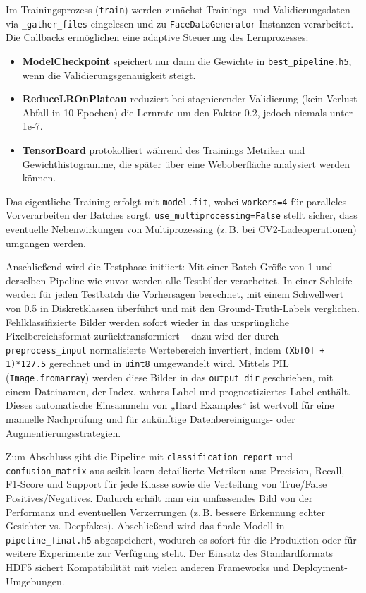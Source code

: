 Im Trainingsprozess (\texttt{train}) werden zunächst Trainings- und Validierungsdaten via \texttt{\_gather\_files} eingelesen und zu \texttt{FaceDataGenerator}-Instanzen verarbeitet. Die Callbacks ermöglichen eine adaptive Steuerung des Lernprozesses:
\begin{itemize}
  \item \textbf{ModelCheckpoint} speichert nur dann die Gewichte in \texttt{best\_pipeline.h5}, wenn die Validierungsgenauigkeit steigt.
  \item \textbf{ReduceLROnPlateau} reduziert bei stagnierender Validierung (kein Verlust-Abfall in 10 Epochen) die Lernrate um den Faktor 0.2, jedoch niemals unter 1e-7.
  \item \textbf{TensorBoard} protokolliert während des Trainings Metriken und Gewichthistogramme, die später über eine Weboberfläche analysiert werden können.
\end{itemize}
Das eigentliche Training erfolgt mit \texttt{model.fit}, wobei \texttt{workers=4} für paralleles Vorverarbeiten der Batches sorgt. \texttt{use\_multiprocessing=False} stellt sicher, dass eventuelle Nebenwirkungen von Multiprozessing (z.\,B. bei CV2-Ladeoperationen) umgangen werden.

Anschließend wird die Testphase initiiert: Mit einer Batch-Größe von 1 und derselben Pipeline wie zuvor werden alle Testbilder verarbeitet. In einer Schleife werden für jeden Testbatch die Vorhersagen berechnet, mit einem Schwellwert von 0.5 in Diskretklassen überführt und mit den Ground-Truth-Labels verglichen. Fehlklassifizierte Bilder werden sofort wieder in das ursprüngliche Pixelbereichsformat zurücktransformiert – dazu wird der durch \texttt{preprocess\_input} normalisierte Wertebereich invertiert, indem \texttt{(Xb[0] + 1)*127.5} gerechnet und in \texttt{uint8} umgewandelt wird. Mittels PIL (\texttt{Image.fromarray}) werden diese Bilder in das \texttt{output\_dir} geschrieben, mit einem Dateinamen, der Index, wahres Label und prognostiziertes Label enthält. Dieses automatische Einsammeln von „Hard Examples“ ist wertvoll für eine manuelle Nachprüfung und für zukünftige Datenbereinigungs- oder Augmentierungsstrategien.

Zum Abschluss gibt die Pipeline mit \texttt{classification\_report} und \texttt{confusion\_matrix} aus scikit-learn detaillierte Metriken aus: Precision, Recall, F1-Score und Support für jede Klasse sowie die Verteilung von True/False Positives/Negatives. Dadurch erhält man ein umfassendes Bild von der Performanz und eventuellen Verzerrungen (z.\,B. bessere Erkennung echter Gesichter vs. Deepfakes). Abschließend wird das finale Modell in \texttt{pipeline\_final.h5} abgespeichert, wodurch es sofort für die Produktion oder für weitere Experimente zur Verfügung steht. Der Einsatz des Standardformats HDF5 sichert Kompatibilität mit vielen anderen Frameworks und Deployment-Umgebungen.

